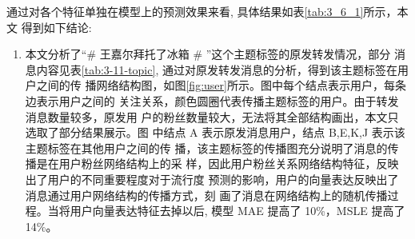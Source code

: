 通过对各个特征单独在模型上的预测效果来看, 具体结果如表\ref{tab:3_6_1}所示，本文 得到如下结论:

\begin{enumerate}

\item 本文分析了“\# 王嘉尔拜托了冰箱 \# ”这个主题标签的原发转发情况，部分 消息内容见表\ref{tab:3-11-topic}, 通过对原发转发消息的分析，得到该主题标签在用户之间的传 播网络结构图，如图\ref{fig:user}所示。图中每个结点表示用户，每条边表示用户之间的 关注关系，颜色圆圈代表传播主题标签的用户。由于转发消息数量较多，原发用 户的粉丝数量较大，无法将其全部结构画出，本文只选取了部分结果展示。图 中结点 A 表示原发消息用户，结点 B,E,K,J 表示该主题标签在其他用户之间的传 播，该主题标签的传播图充分说明了消息的传播是在用户粉丝网络结构上的采 样，因此用户粉丝关系网络结构特征，反映出了用户的不同重要程度对于流行度 预测的影响，用户的向量表达反映出了消息通过用户网络结构的传播方式，刻 画了消息在网络结构上的随机传播过程。当将用户向量表达特征去掉以后, 模型 MAE 提高了 10\%，MSLE 提高了 14\%。



\end{enumerate}
